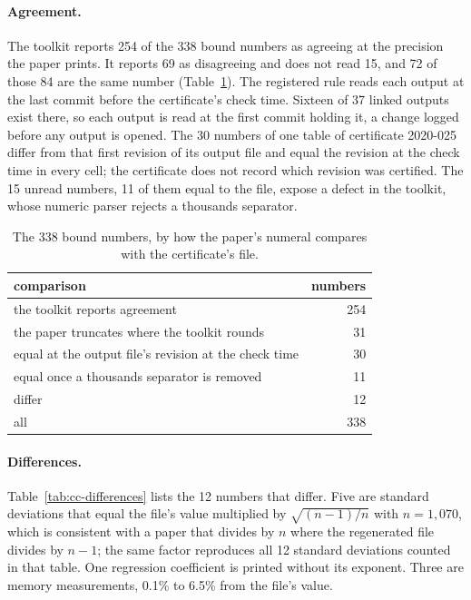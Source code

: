 \paragraph{Agreement.} The toolkit reports 254 of the 338 bound numbers as agreeing at the
precision the paper prints. It reports 69 as disagreeing and does not read 15, and 72 of those
84 are the same number (Table~\ref{tab:cc-agreement}). The registered rule reads each output at the last commit before the certificate's check time.
Sixteen of 37 linked outputs exist there, so each output is read at the first commit holding
it, a change logged before any output is opened. The 30 numbers of one table of certificate
2020-025 differ from that first revision of its output file and equal the revision at the check
time in every cell; the certificate does not record which revision was certified. The 15 unread numbers, 11 of them equal to the file, expose a defect in the toolkit, whose
numeric parser rejects a thousands separator.

\vspace{0.5em}
\begin{table}[H]
\centering
\small
\caption{The 338 bound numbers, by how the paper's numeral compares with the certificate's
file.}
\label{tab:cc-agreement}
\begin{tabular}{@{}>{\raggedright\arraybackslash}p{}r@{}}
\toprule
comparison & numbers \\
\midrule
the toolkit reports agreement & 254 \\
the paper truncates where the toolkit rounds & 31 \\
equal at the output file's revision at the check time & 30 \\
equal once a thousands separator is removed & 11 \\
differ & 12 \\
\midrule
all & 338 \\
\bottomrule
\end{tabular}
\end{table}

\paragraph{Differences.} Table~\ref{tab:cc-differences} lists the 12 numbers that differ. Five
are standard deviations that equal the file's value multiplied by $\sqrt{(n-1)/n}$ with
$n = 1{,}070$, which is consistent with a paper that divides by $n$ where the regenerated file
divides by $n-1$; the same factor reproduces all 12 standard deviations counted in that table.
One regression coefficient is printed without its exponent. Three are memory measurements, 0.1\%
to 6.5\% from the file's value.

